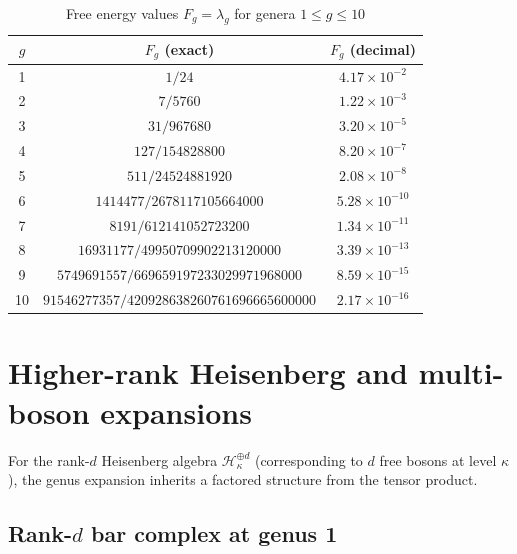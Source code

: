 \begin{table}[ht]
\centering
\caption{Free energy values $F_g = \lambda_g$ for genera $1 \le g \le 10$}
\label{tab:free-energy-values}
\begin{tabular}{|c|c|c|}
\hline
$g$ & $F_g$ (exact) & $F_g$ (decimal) \\
\hline
1 & $1/24$ & $4.17 \times 10^{-2}$ \\
2 & $7/5760$ & $1.22 \times 10^{-3}$ \\
3 & $31/967680$ & $3.20 \times 10^{-5}$ \\
4 & $127/154828800$ & $8.20 \times 10^{-7}$ \\
5 & $511/24524881920$ & $2.08 \times 10^{-8}$ \\
6 & $1414477/2678117105664000$ & $5.28 \times 10^{-10}$ \\
7 & $8191/612141052723200$ & $1.34 \times 10^{-11}$ \\
8 & $16931177/49950709902213120000$ & $3.39 \times 10^{-13}$ \\
9 & $5749691557/669659197233029971968000$ & $8.59 \times 10^{-15}$ \\
10 & $91546277357/420928638260761696665600000$ & $2.17 \times 10^{-16}$ \\
\hline
\end{tabular}
\end{table}

\section{Higher-rank Heisenberg and multi-boson expansions}
\label{sec:higher-rank-heisenberg-eisenstein}

For the rank-$d$ Heisenberg algebra $\mathcal{H}_\kappa^{\oplus d}$
(corresponding to $d$ free bosons at level $\kappa$), the genus
expansion inherits a factored structure from the tensor product.

\subsection{\texorpdfstring{Rank-$d$ bar complex at genus 1}{Rank-d bar complex at genus 1}}

